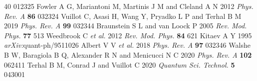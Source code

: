 \documentclass[10pt]{iopart}
\begin{document}
\begin{thebibliography}{40}
012325
 Fowler A G, Mariantoni M, Martinis J M and Cleland A N
2012 {\it Phys. Rev. A} {\bf 86} 032324
 Vuillot C, Asasi H, Wang Y, Pryadko L P and Terhal B M
2019 {\it Phys. Rev. A} {\bf 99} 032344
 Braunstein S L and van Loock P 2005 {\it Rev. Mod.
Phys.} {\bf 77} 513
 Weedbrook C {\it et al.} 2012 {\it Rev. Mod. Phys.}
{\bf 84} 621
 Kitaev A Y 1995 {\it arXiv:}quant-ph/9511026
 Albert V V {\it et al.} 2018 {\it Phys. Rev. A} {\bf 97}
032346
 Walshe B W, Baragiola B Q, Alexander R N and Menicucci N C
2020 {\it Phys. Rev. A} {\bf 102} 062411
 Terhal B M, Conrad J and Vuillot C 2020 {\it Quantum Sci.
Technol.} {\bf 5} 043001
\end{thebibliography}
\end{document}
